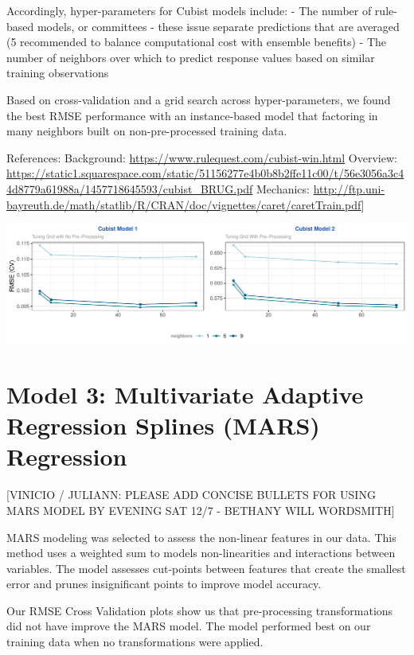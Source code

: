 \documentclass[]{report}
\begin{document}
Accordingly, hyper-parameters for Cubist models include: - The number of
rule-based models, or committees - these issue separate predictions that
are averaged (5 recommended to balance computational cost with ensemble
benefits) - The number of neighbors over which to predict response
values based on similar training observations

Based on cross-validation and a grid search across hyper-parameters, we
found the best RMSE performance with an instance-based model that
factoring in many neighbors built on non-pre-processed training data.

References: Background: \url{https://www.rulequest.com/cubist-win.html}
Overview:
\url{https://static1.squarespace.com/static/51156277e4b0b8b2ffe11c00/t/56e3056a3c44d8779a61988a/1457718645593/cubist_BRUG.pdf}
Mechanics:
\url{http://ftp.uni-bayreuth.de/math/statlib/R/CRAN/doc/vignettes/caret/caretTrain.pdf}{]}

\includegraphics{Group2_Project2_Fall2019_files/figure-latex/unnamed-chunk-10-1.pdf}

\hypertarget{model-3-multivariate-adaptive-regression-splines-mars-regression}{%
\section{Model 3: Multivariate Adaptive Regression Splines (MARS)
Regression}\label{model-3-multivariate-adaptive-regression-splines-mars-regression}}

{[}VINICIO / JULIANN: PLEASE ADD CONCISE BULLETS FOR USING MARS MODEL BY
EVENING SAT 12/7 - BETHANY WILL WORDSMITH{]}

MARS modeling was selected to assess the non-linear features in our
data. This method uses a weighted sum to models non-linearities and
interactions between variables. The model assesses cut-points between
features that create the smallest error and prunes insignificant points
to improve model accuracy.

Our RMSE Cross Validation plots show us that pre-processing
transformations did not have improve the MARS model. The model performed
best on our training data when no transformations were applied.
\end{document}
